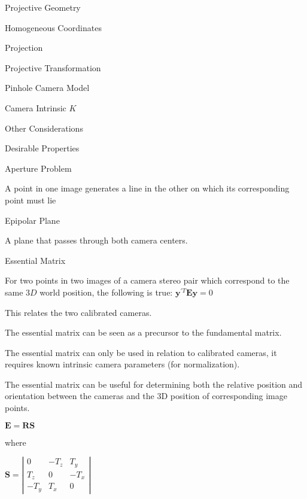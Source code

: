 \begin{section}
\begin{subsubsection}
\begin{subsubsection}
\begin{subsubsection}
\begin{section}{Projective Geometry}
\begin{subsection}{Homogeneous Coordinates}
\begin{subsubsection}
{\begin{subsubsection}{Projection}
\begin{subsubsection}{Projective Transformation}
\begin{subsection}
\begin{subsubsection}
\begin{subsubsection}
\begin{subsubsection}
{\begin{subsubsection}
\begin{subsection}
\begin{subsection} {Pinhole Camera Model}
\begin{subsection} {Camera Intrinsic $K$}
\begin{subsection}
\begin{subsection}
\begin{subsubsection}{Other Considerations}
{\begin{subsection}
\begin{subsubsection}{Desirable Properties}
\begin{section}
\begin{subsection}
\begin{subsection}
\begin{subsection}
\begin{section}
\begin{subsection}
\begin{subsubsection}
\begin{subsubsection}
\begin{subsection}
\begin{section}
\begin{subsection}
\begin{subsubsection}{Aperture Problem}
\begin{subsubsection}
{\begin{section}
\begin{subsubsection}
\begin{subsubsection}
A point in one image generates a line in the other on which its corresponding point must lie

\begin{subsubsection} Epipolar Plane

A plane that passes through both camera centers.

\begin{subsection} Essential Matrix

For two points in two images of a camera stereo pair which correspond to the same $3D$ world position, the following is true: 
$\mathbf{y}^{\prime T}\mathbf{Ey}=0$

This relates the two calibrated cameras.

The essential matrix can be seen as a precursor to the fundamental matrix. 

The essential matrix can only be used in relation to calibrated cameras, it requires known intrinsic camera parameters (for normalization).

The essential matrix can be useful for determining both the relative position and orientation between the cameras and the 3D position of corresponding image points.

$\mathbf{E}=\mathbf{RS}$

where 

$\mathbf{S} = \left| \begin{matrix} 0 & -T_z & T_y \\ T_z & 0 & -T_x \\ -T_y & T_x & 0  \end{matrix} \right|$


\end{subsection}
\end{subsubsection}
\end{subsubsection}
\end{subsubsection}
\end{section}}
\end{subsubsection}
\end{subsubsection}
\end{subsection}
\end{section}
\end{subsection}
\end{subsubsection}
\end{subsubsection}
\end{subsection}
\end{section}
\end{subsection}
\end{subsection}
\end{subsection}
\end{section}
\end{subsubsection}
\end{subsection}}
\end{subsubsection}
\end{subsection}
\end{subsection}
\end{subsection}
\end{subsection}
\end{subsection}
\end{subsubsection}}
\end{subsubsection}
\end{subsubsection}
\end{subsubsection}
\end{subsection}
\end{subsubsection}
\end{subsubsection}}
\end{subsubsection}
\end{subsection}
\end{section}
\end{subsubsection}
\end{subsubsection}
\end{subsubsection}
\end{section}
